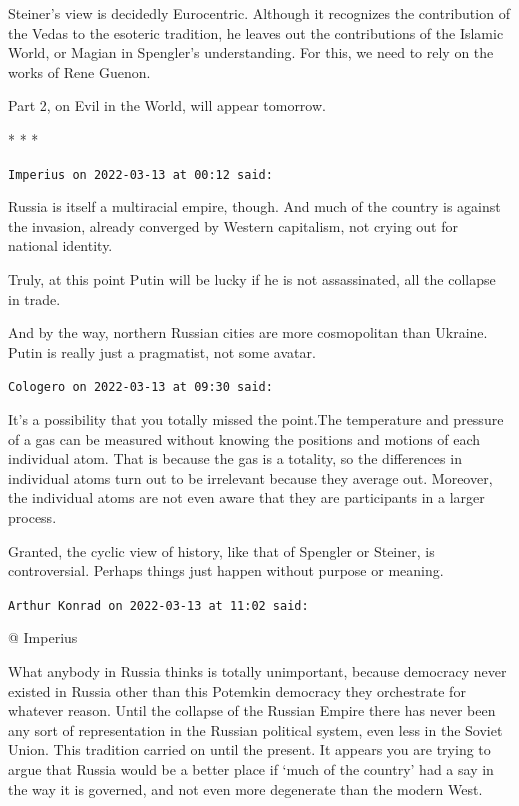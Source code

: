 Steiner's view is decidedly Eurocentric. Although it recognizes the contribution of the Vedas to the esoteric tradition, he leaves out the contributions of the Islamic World, or Magian in Spengler's understanding. For this, we need to rely on the works of Rene Guenon.

{Part 2, on Evil in the World, will appear tomorrow.}



\begin{center}* * *\end{center}

\begin{footnotesize}
\begin{sffamily}
\texttt{Imperius on 2022-03-13 at 00:12 said:}

Russia is itself a multiracial empire, though. And much of the country is against the invasion, already converged by Western capitalism, not crying out for national identity.

Truly, at this point Putin will be lucky if he is not assassinated, all the collapse in trade.

And by the way, northern Russian cities are more cosmopolitan than Ukraine. Putin is really just a pragmatist, not some avatar.

\hfill

\texttt{Cologero on 2022-03-13 at 09:30 said:}

It's a possibility that you totally missed the point.The temperature and pressure of a gas can be measured without knowing the positions and motions of each individual atom. That is because the gas is a totality, so the differences in individual atoms turn out to be irrelevant because they average out. Moreover, the individual atoms are not even aware that they are participants in a larger process.

Granted, the cyclic view of history, like that of Spengler or Steiner, is controversial. Perhaps things just happen without purpose or meaning.

\hfill

\texttt{Arthur Konrad on 2022-03-13 at 11:02 said:}

@ Imperius

What anybody in Russia thinks is totally unimportant, because democracy never existed in Russia other than this Potemkin democracy they orchestrate for whatever reason. Until the collapse of the Russian Empire there has never been any sort of representation in the Russian political system, even less in the Soviet Union. This tradition carried on until the present. It appears you are trying to argue that Russia would be a better place if `much of the country' had a say in the way it is governed, and not even more degenerate than the modern West.


\end{sffamily}
\end{footnotesize}
